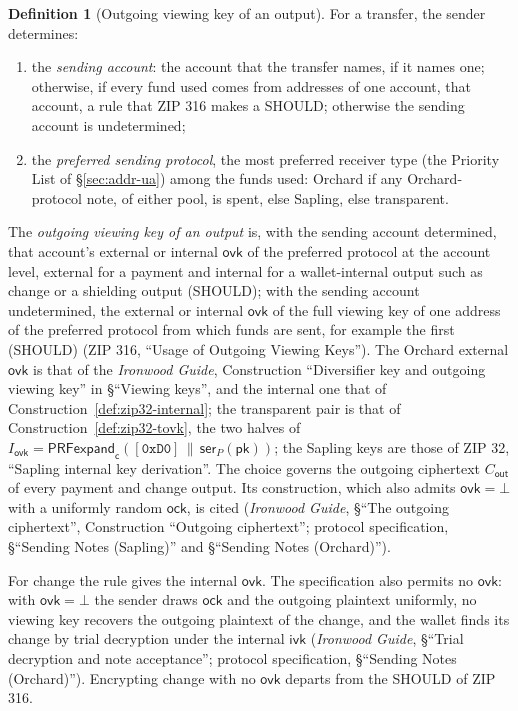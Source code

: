\documentclass[11pt,a4paper]{article}
\theoremstyle{definition}
\newtheorem{definition}[theorem]{Definition}
\newcommand{\ivk}{\ensuremath{\mathsf{ivk}}}
\newcommand{\ovk}{\ensuremath{\mathsf{ovk}}}
\begin{document}
\begin{definition}[Outgoing viewing key of an output]\label{def:ovk-select}
For a transfer, the sender determines:
\begin{enumerate}[label=(\alph*)]
\item the \emph{sending account}: the account that the transfer names, if
  it names one; otherwise, if every fund used comes from addresses of one
  account, that account, a rule that ZIP 316 makes a SHOULD; otherwise the
  sending account is undetermined;
\item the \emph{preferred sending protocol}, the most preferred receiver
  type (the Priority List of \S\ref{sec:addr-ua}) among the funds used:
  Orchard if any Orchard-protocol note, of either pool, is spent, else
  Sapling, else transparent.
\end{enumerate}
The \emph{outgoing viewing key of an output} is, with the sending account
determined, that account's external or internal $\ovk$ of the preferred
protocol at the account level, external for a payment and internal for a
wallet-internal output such as change or a shielding output (SHOULD); with
the sending account undetermined, the external or internal $\ovk$ of the
full viewing key of one address of the preferred protocol from which funds
are sent, for example the first (SHOULD) (ZIP 316, ``Usage of Outgoing
Viewing Keys''). The Orchard external $\ovk$ is that of the \emph{Ironwood
Guide}, Construction ``Diversifier key and outgoing viewing key'' in
\S``Viewing keys'', and the internal one that of
Construction~\ref{def:zip32-internal}; the transparent pair is that of
Construction~\ref{def:zip32-tovk}, the two halves of
$I_{\ovk} = \mathsf{PRFexpand}_{\mathsf{c}}([\mathtt{0xD0}] \,\|\,
\mathsf{ser}_P(\mathsf{pk}))$; the Sapling keys are those of ZIP 32,
``Sapling internal key derivation''. The choice governs the outgoing
ciphertext $C_{\mathsf{out}}$ of every payment and change output. Its
construction, which also admits $\ovk = \bot$ with a uniformly random
$\mathsf{ock}$, is cited (\emph{Ironwood Guide}, \S``The outgoing
ciphertext'', Construction ``Outgoing ciphertext''; protocol
specification, \S``Sending Notes (Sapling)'' and \S``Sending Notes
(Orchard)'').
\end{definition}

For change the rule gives the internal $\ovk$. The specification also
permits no $\ovk$: with $\ovk = \bot$ the sender draws $\mathsf{ock}$ and
the outgoing plaintext uniformly, no viewing key recovers the outgoing
plaintext of the change, and the wallet finds its change by trial decryption
under the internal $\ivk$ (\emph{Ironwood Guide}, \S``Trial decryption and
note acceptance''; protocol specification, \S``Sending Notes (Orchard)'').
Encrypting change with no $\ovk$ departs from the SHOULD of ZIP 316.
\end{document}
